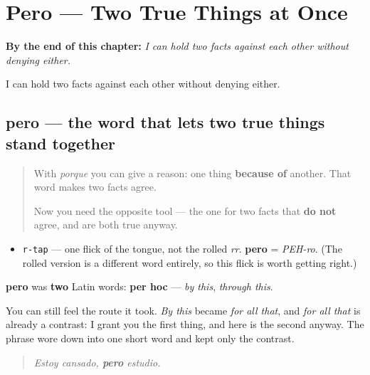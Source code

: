 
\chapter{Pero --- Two True Things at Once}
\label{ch:pero}

\begin{chapteropening}
\textbf{By the end of this chapter:} \emph{I can hold two facts against each other without denying either.}

I can hold two facts against each other without denying either.
\end{chapteropening}

\section[pero]{pero — the word that lets two true things stand together}

\label{lesson:ES-C58-pero}



\begin{quote}
With \emph{porque} you can give a reason: one thing \textbf{because of} another. That word makes two facts agree.

Now you need the opposite tool — the one for two facts that \textbf{do not} agree, and are both true anyway.
\end{quote}

\begin{sounds}
\begin{itemize}
\raggedright
  \item \texttt{r-tap} — one flick of the tongue, not the rolled \emph{rr}. \textbf{pero} = \emph{PEH-ro}. (The rolled version is a different word entirely, so this flick is worth getting right.)
\end{itemize}
\end{sounds}

\begin{cousinweb}
\textbf{pero} was \textbf{two} Latin words: \textbf{per hoc} — \emph{by this}, \emph{through this}.

You can still feel the route it took. \emph{By this} became \emph{for all that}, and \emph{for all that} is already a contrast: I grant you the first thing, and here is the second anyway. The phrase wore down into one short word and kept only the contrast.

\begin{quote}
\emph{Estoy cansado, \textbf{pero} estudio.}
\end{quote}
\end{cousinweb}

